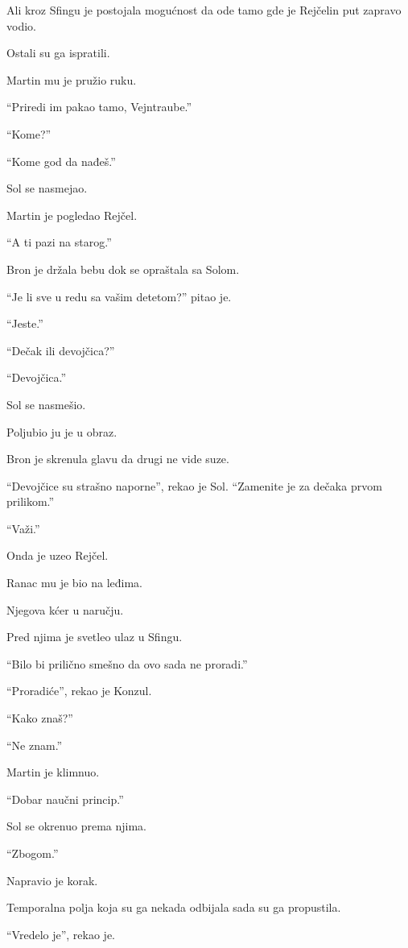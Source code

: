Ali kroz Sfingu je postojala mogućnost da ode tamo gde je Rejčelin put zapravo vodio.

\bigskip

Ostali su ga ispratili.

Martin mu je pružio ruku.

``Priredi im pakao tamo, Vejntraube.''

``Kome?''

``Kome god da nađeš.''

Sol se nasmejao.

Martin je pogledao Rejčel.

``A ti pazi na starog.''

\bigskip

Bron je držala bebu dok se opraštala sa Solom.

``Je li sve u redu sa vašim detetom?'' pitao je.

``Jeste.''

``Dečak ili devojčica?''

``Devojčica.''

Sol se nasmešio.

Poljubio ju je u obraz.

Bron je skrenula glavu da drugi ne vide suze.

``Devojčice su strašno naporne'', rekao je Sol. ``Zamenite je za dečaka prvom prilikom.''

``Važi.''

\bigskip

Onda je uzeo Rejčel.

Ranac mu je bio na leđima.

Njegova kćer u naručju.

Pred njima je svetleo ulaz u Sfingu.

``Bilo bi prilično smešno da ovo sada ne proradi.''

``Proradiće'', rekao je Konzul.

``Kako znaš?''

``Ne znam.''

Martin je klimnuo.

``Dobar naučni princip.''

\bigskip

Sol se okrenuo prema njima.

``Zbogom.''

Napravio je korak.

Temporalna polja koja su ga nekada odbijala sada su ga propustila.

``Vredelo je'', rekao je.

